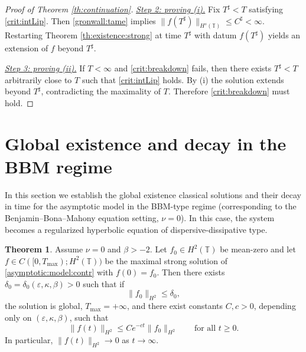 \documentclass[reqno]{amsart}
\newcommand{\TT}{\mathbb T}
\theoremstyle{definition}
\newtheorem{theorem}{Theorem}
\numberwithin{equation}{section}
\numberwithin{theorem}{section}
\numberwithin{definition}{section}
\begin{document}
\begin{proof}[Proof of Theorem \ref{th:continuation}]
\medskip\noindent
\underline{\textit{Step 2: proving (i).}}
Fix $T^\sharp<T$ satisfying \eqref{crit:intLip}. Then \eqref{gronwall:tame} implies
$\|f(T^\sharp)\|_{H^s(\TT)}\le C^\sharp<\infty$.
Restarting Theorem \ref{th:existence:strong} at time $T^\sharp$ with datum $f(T^\sharp)$ yields an extension of $f$
beyond $T^\sharp$.

\medskip\noindent
\underline{\textit{Step 3: proving (ii).}}
If $T<\infty$ and \eqref{crit:breakdown} fails, then there exists $T^\sharp<T$ arbitrarily close to $T$ such that
\eqref{crit:intLip} holds. By (i) the solution extends beyond $T^\sharp$, contradicting the maximality of $T$.
Therefore \eqref{crit:breakdown} must hold.
\end{proof}





\section{Global existence and decay in the BBM regime}\label{sec:bbm-global}
In this section we establish the global existence classical solutions and their decay in time for the asymptotic model in the BBM-type regime (corresponding to the Benjamin–Bona–Mahony equation setting, $\nu=0$). In this case, the system becomes a regularized hyperbolic equation of dispersive-dissipative type.
\begin{theorem}\label{th:bbm-global}
	Assume $\nu=0$ and $\beta>-2$. Let $f_0\in H^2(\TT)$ be mean-zero and let
	$f\in C([0,T_{\max});H^2(\TT))$ be the maximal strong solution of \eqref{asymptotic:model:contr} with $f(0)=f_0$. Then there exists $\delta_0=\delta_0(\varepsilon,\kappa,\beta)>0$ such that if
	\[
	\|f_0\|_{H^2}\le \delta_0,
	\]
	the solution is global, $T_{\max}=+\infty$, and there exist constants $C,c>0$, depending only on
	$(\varepsilon,\kappa,\beta)$, such that
	\[
	\|f(t)\|_{H^2}\le C e^{-ct}\|f_0\|_{H^2}\qquad\text{for all }t\ge 0.
	\]
	In particular, $\|f(t)\|_{H^2}\to 0$ as $t\to\infty$.
\end{theorem}
\end{document}
